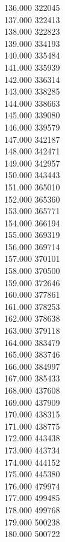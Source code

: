 { 136.000	322045 \\
 137.000	322413 \\
 138.000	322823 \\
 139.000	334193 \\
 140.000	335484 \\
 141.000	335939 \\
 142.000	336314 \\
 143.000	338285 \\
 144.000	338663 \\
 145.000	339080 \\
 146.000	339579 \\
 147.000	342187 \\
 148.000	342471 \\
 149.000	342957 \\
 150.000	343443 \\
 151.000	365010 \\
 152.000	365360 \\
 153.000	365771 \\
 154.000	366194 \\
 155.000	369319 \\
 156.000	369714 \\
 157.000	370101 \\
 158.000	370500 \\
 159.000	372646 \\
 160.000	377861 \\
 161.000	378253 \\
 162.000	378638 \\
 163.000	379118 \\
 164.000	383479 \\
 165.000	383746 \\
 166.000	384997 \\
 167.000	385433 \\
 168.000	437608 \\
 169.000	437909 \\
 170.000	438315 \\
 171.000	438775 \\
 172.000	443438 \\
 173.000	443734 \\
 174.000	444152 \\
 175.000	445380 \\
 176.000	479974 \\
 177.000	499485 \\
 178.000	499768 \\
 179.000	500238 \\
 180.000	500722 \\
}
